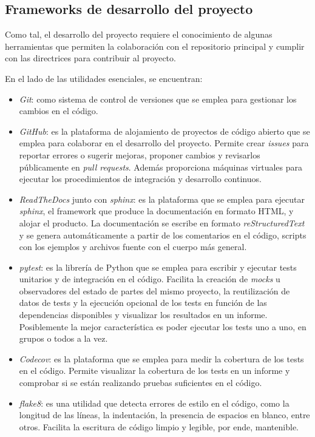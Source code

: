 \subsection{Frameworks de desarrollo del proyecto} \label{sct:pvlib:dev}

Como tal, el desarrollo del proyecto requiere el conocimiento de algunas herramientas que permiten la colaboración con el repositorio principal y cumplir con las directrices para contribuir al proyecto.

En el lado de las utilidades esenciales, se encuentran:

\begin{itemize}
      \item \textit{Git}: como sistema de control de versiones que se emplea para gestionar los cambios en el código.
      \item \textit{GitHub}: es la plataforma de alojamiento de proyectos de código abierto que se emplea para colaborar en el desarrollo del proyecto. Permite crear \textit{issues} para reportar errores o sugerir mejoras, proponer cambios y revisarlos públicamente en \textit{pull requests}. Además proporciona máquinas virtuales para ejecutar los procedimientos de integración y desarrollo continuos.
      \item \textit{ReadTheDocs} junto con \textit{sphinx}: es la plataforma que se emplea para ejecutar \textit{sphinx}, el framework que produce la documentación en formato HTML, y alojar el producto. La documentación se escribe en formato \textit{reStructuredText} y se genera automáticamente a partir de los comentarios en el código, scripts con los ejemplos y archivos fuente con el cuerpo más general.
      \item \textit{pytest}: es la librería de Python que se emplea para escribir y ejecutar tests unitarios y de integración en el código. Facilita la creación de \textit{mocks} u observadores del estado de partes del mismo proyecto, la reutilización de datos de tests y la ejecución opcional de los tests en función de las dependencias disponibles y visualizar los resultados en un informe. Posiblemente la mejor característica es poder ejecutar los tests uno a uno, en grupos o todos a la vez.
      \item \textit{Codecov}: es la plataforma que se emplea para medir la cobertura de los tests en el código. Permite visualizar la cobertura de los tests en un informe y comprobar si se están realizando pruebas suficientes en el código.
      \item \textit{flake8}: es una utilidad que detecta errores de estilo en el código, como la longitud de las líneas, la indentación, la presencia de espacios en blanco, entre otros. Facilita la escritura de código limpio y legible, por ende, mantenible.

\end{itemize}

